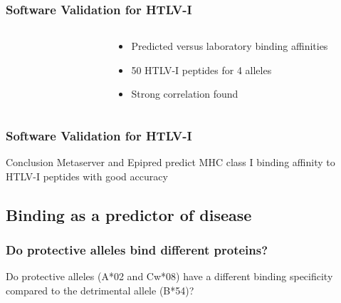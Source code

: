 \documentclass[slidescentered,compress]{beamer}
\begin{document}
\frame
{
\frametitle{Software Validation for HTLV-I}

\begin{columns}[c]

\begin{column}{6cm}
\begin{figure}
\end{figure}
\end{column}

\begin{column}{4cm}
\begin{itemize}
\item Predicted versus laboratory binding affinities
\item 50 HTLV-I peptides for 4 alleles
\item Strong correlation found
\end{itemize}
\end{column}

\end{columns}

}

\frame
{
\frametitle{Software Validation for HTLV-I}

\begin{block}{Conclusion}
Metaserver and Epipred predict MHC class I binding affinity to HTLV-I peptides with good accuracy
\end{block}
}


\subsection{Binding as a predictor of disease}

\frame
{
\frametitle{Do protective alleles bind different proteins?}

Do protective alleles (A*02 and Cw*08) have a different binding specificity compared to the detrimental allele (B*54)?

}
\end{document}
